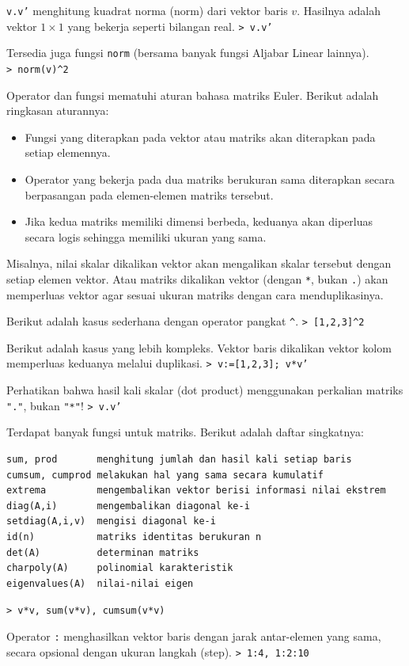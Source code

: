 \documentclass[11pt, a4paper]{article}
\newcommand{\emtcmd}[1]{\noindent\texttt{\textcolor{emtcommand}{>}\ #1}\par\smallskip}
\begin{document}
\texttt{v.v'} menghitung kuadrat norma (norm) dari vektor baris $v$. Hasilnya adalah vektor $1 \times 1$ yang bekerja seperti bilangan real.
\emtcmd{v.v'}

Tersedia juga fungsi \texttt{norm} (bersama banyak fungsi Aljabar Linear lainnya).
\emtcmd{norm(v)\^{}2}

Operator dan fungsi mematuhi aturan bahasa matriks Euler. Berikut adalah ringkasan aturannya:
\begin{itemize}
    \item Fungsi yang diterapkan pada vektor atau matriks akan diterapkan pada setiap elemennya.
    \item Operator yang bekerja pada dua matriks berukuran sama diterapkan secara berpasangan pada elemen-elemen matriks tersebut.
    \item Jika kedua matriks memiliki dimensi berbeda, keduanya akan diperluas secara logis sehingga memiliki ukuran yang sama.
\end{itemize}

Misalnya, nilai skalar dikalikan vektor akan mengalikan skalar tersebut dengan setiap elemen vektor. Atau matriks dikalikan vektor (dengan \texttt{*}, bukan \texttt{.}) akan memperluas vektor agar sesuai ukuran matriks dengan cara menduplikasinya.

Berikut adalah kasus sederhana dengan operator pangkat \texttt{\^{}}.
\emtcmd{[1,2,3]\^{}2}

Berikut adalah kasus yang lebih kompleks. Vektor baris dikalikan vektor kolom memperluas keduanya melalui duplikasi.
\emtcmd{v:=[1,2,3]; v*v'}

Perhatikan bahwa hasil kali skalar (dot product) menggunakan perkalian matriks \texttt{"."}, bukan \texttt{"*"}!
\emtcmd{v.v'}

Terdapat banyak fungsi untuk matriks. Berikut adalah daftar singkatnya:
\begin{verbatim}
sum, prod       menghitung jumlah dan hasil kali setiap baris
cumsum, cumprod melakukan hal yang sama secara kumulatif
extrema         mengembalikan vektor berisi informasi nilai ekstrem
diag(A,i)       mengembalikan diagonal ke-i
setdiag(A,i,v)  mengisi diagonal ke-i
id(n)           matriks identitas berukuran n
det(A)          determinan matriks
charpoly(A)     polinomial karakteristik
eigenvalues(A)  nilai-nilai eigen
\end{verbatim}
\emtcmd{v*v, sum(v*v), cumsum(v*v)}

Operator \texttt{:} menghasilkan vektor baris dengan jarak antar-elemen yang sama, secara opsional dengan ukuran langkah (step).
\emtcmd{1:4, 1:2:10}
\end{document}
